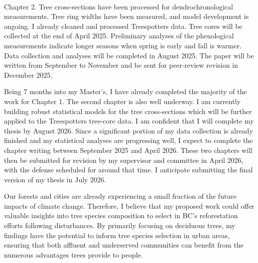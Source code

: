 \documentclass[11pt,letter]{article}
\begin{document}
\\
Chapter 2. Tree cross-sections have been processed for dendrochronological measurements. Tree ring widths have been measured, and model development is ongoing. I already cleaned and processed Treespotters data. Tree cores will be collected at the end of April  2025. Preliminary analyses of the phenological measurements indicate longer seasons when spring is early and fall is warmer. Data collection and analyses will be completed in August 2025. The paper will be written from September to November and be sent for peer-review revision in December 2025.

Being 7 months into my Master’s, I have already completed the majority of the work for Chapter 1. The second chapter is also well underway. I am currently building robust statistical models for the tree cross-sections which will be further applied to the Treespotters tree-core data. 
I am confident that I will complete my thesis by August 2026. Since a significant portion of my data collection is already finished and my statistical analyses are progressing well, I expect to complete the chapter writing between September 2025 and April 2026. These two chapters will then be submitted for revision by my supervisor and committee in April 2026, with the defense scheduled for around that time. I anticipate submitting the final version of my thesis in July 2026.

Our forests and cities are already experiencing a small fraction of the future impacts of climate change. Therefore, I believe that my proposed work could offer valuable insights into tree species composition to select in BC's reforestation efforts following disturbances. By primarily focusing on deciduous trees, my findings have the potential to inform tree species selection in urban areas, ensuring that both affluent and underserved communities can benefit from the numerous advantages trees provide to people.

\end{document}
